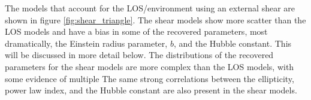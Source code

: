 The models that account for the LOS/environment using an external shear are shown in figure \ref{fig:shear_triangle}. The shear models show more scatter than the LOS models and have a bias in some of the recovered parameters, most dramatically, the Einstein radius parameter, $b$, and the Hubble constant. This will be discussed in more detail below. The distributions of the recovered parameters for the shear models are more complex than the LOS models, with some evidence of multiple The same strong correlations between the ellipticity, power law index, and the Hubble constant are also present in the shear models. 